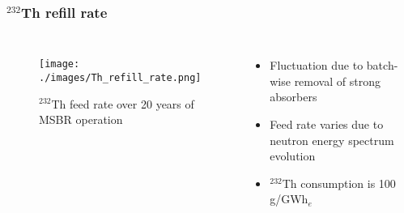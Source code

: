 \begin{frame}
  \frametitle{$^{232}$Th refill rate}
    \begin{columns}
    \column[t]{7cm}
   \vspace{-0.35in}
  \begin{figure}[t]
   \hspace*{-0.2in}
   \texttt{[image: ./images/Th\_refill\_rate.png]}
   \vspace{-0.05in}
   \caption{$^{232}$Th feed rate over 20 years of \gls{MSBR} operation}
    \end{figure}

    \column[t]{4.5cm}
       \begin{itemize}
	        \item Fluctuation due to batch-wise removal of strong absorbers
   		\item Feed rate varies due to neutron energy spectrum evolution
   		\item $^{232}$Th consumption is 100 g/GWh$_e$
       \end{itemize}
     \end{columns}
\end{frame}

